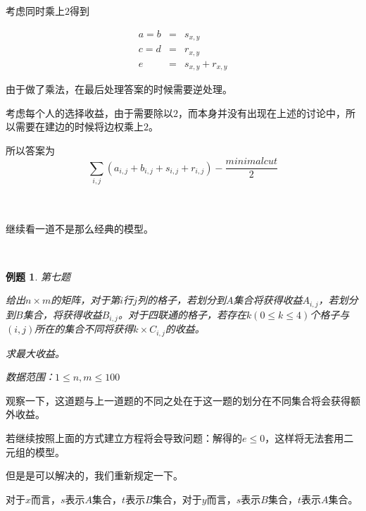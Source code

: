 \documentclass[a4paper]{article}
\newtheorem{problem}{例题}
\begin{document}
考虑同时乘上$2$得到

\begin{eqnarray*} 
  a = b &=& s_{x,y} \\
  c = d &=& r_{x,y} \\
  e &=& s_{x,y}+r_{x,y} 
\end{eqnarray*}

由于做了乘法，在最后处理答案的时候需要逆处理。

考虑每个人的选择收益，由于需要除以$2$，而本身并没有出现在上述的讨论中，所以需要在建边的时候将边权乘上$2$。

所以答案为$$\sum_{i,j}(a_{i,j}+b_{i,j}+s_{i,j}+r_{i,j}) -\frac{minimalcut}{2}$$

~\\
~\\

继续看一道不是那么经典的模型。

~\\

\begin{problem}
  第七题

  给出$n\times m$的矩阵，对于第$i$行$j$列的格子，若划分到$A$集合将获得收益$A_{i,j}$，若划分到$B$集合，将获得收益$B_{i,j}$。对于四联通的格子，若存在$k(0\le k \le 4)$个格子与$(i,j)$所在的集合不同将获得$k\times C_{i,j}$的收益。

  求最大收益。

  数据范围：$1\le n,m\le 100$
\end{problem}

观察一下，这道题与上一道题的不同之处在于这一题的划分在不同集合将会获得额外收益。

若继续按照上面的方式建立方程将会导致问题：解得的$e\le 0$，这样将无法套用二元组的模型。

\begin{figure}[htb]        
\end{figure}

但是是可以解决的，我们重新规定一下。

对于$x$而言，$s$表示$A$集合，$t$表示$B$集合，对于$y$而言，$s$表示$B$集合，$t$表示$A$集合。
\end{document}
